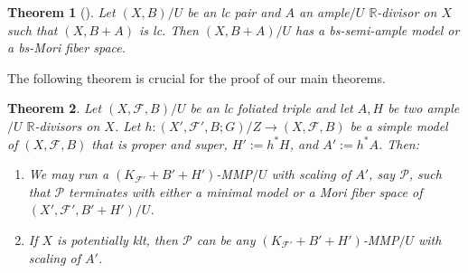 \documentclass[11pt]{amsart}
\numberwithin{equation}{section}
\newcommand{\Rr}{\mathbb{R}}
\newcommand{\Ff}{\mathcal{F}}
\newtheorem{thm}{Theorem}[section]
\theoremstyle{definition}
\theoremstyle{definition}
\theoremstyle{definition}
\begin{document}
\begin{thm}[{\cite[Theorem 1.5]{HH20}}]\label{thm: hh20 1.5}
    Let $(X,B)/U$ be an lc pair and $A$ an ample$/U$ $\Rr$-divisor on $X$ such that $(X,B+A)$ is lc. Then $(X,B+A)/U$ has a bs-semi-ample model or a bs-Mori fiber space.
\end{thm}


The following theorem is crucial for the proof of our main theorems.

\begin{thm}\label{thm: take proper simple model run mmp}
    Let $(X,\Ff,B)/U$ be an lc foliated triple and let $A,H$ be two ample$/U$ $\Rr$-divisors on $X$. Let $h: (X',\Ff',B;G)/Z\rightarrow (X,\Ff,B)$ be a simple model of $(X,\Ff,B)$ that is proper and super, $H':=h^*H$, and $A':=h^*A$. Then:
    \begin{enumerate}
        \item We may run a $(K_{\Ff'}+B'+H')$-MMP$/U$ with scaling of $A'$, say $\mathcal{P}$, such that $\mathcal{P}$ terminates with either a minimal model or a Mori fiber space of $(X',\Ff',B'+H')/U$.
        \item If $X$ is potentially klt, then $\mathcal{P}$ can be any $(K_{\Ff'}+B'+H')$-MMP$/U$ with scaling of $A'$.
    \end{enumerate}
\end{thm}
\end{document}
